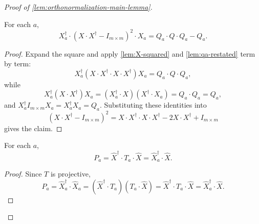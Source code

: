 \begin{proof}[Proof of \ref{lem:orthonormalization-main-lemma}]
	\begin{lemma}\label{lem:X-expression-to-Q-expression}
		\leanok
		For each $a$,
		\begin{equation*}
			X_a^\dagger \cdot (X \cdot X^\dagger - I_{m \times m})^2 \cdot X_a
			=
			Q_a \cdot Q \cdot Q_a - Q_a.
		\end{equation*}
	\end{lemma}
	\begin{proof}
		\leanok
		Expand the square and apply \ref{lem:X-squared} and \ref{lem:qa-restated} term by term:
		\[
			X_a^\dagger (X \cdot X^\dagger \cdot X \cdot X^\dagger) X_a
			=
			Q_a \cdot Q \cdot Q_a,
		\]
		while
		\[
			X_a^\dagger (X \cdot X^\dagger) X_a
			=
			(X_a^\dagger \cdot X)(X^\dagger \cdot X_a)
			=
			Q_a \cdot Q_a
			=
			Q_a,
		\]
		and $X_a^\dagger I_{m \times m} X_a = X_a^\dagger X_a = Q_a$. Substituting these identities into
		\[
			(X \cdot X^\dagger - I_{m \times m})^2
			=
			X \cdot X^\dagger \cdot X \cdot X^\dagger - 2X \cdot X^\dagger + I_{m \times m}
		\]
		gives the claim.
	\end{proof}

	\begin{lemma}[$P_a$ restated]\label{lem:pa-restated}
		\leanok
		For each $a$,
		\begin{equation*}
			P_a = \widehat{X}^\dagger \cdot T_a \cdot \widehat{X} = \widehat{X}_a^\dagger \cdot \widehat{X}.
		\end{equation*}
	\end{lemma}
	\begin{proof}
		\leanok
		Since $T$ is projective,
		\[
			P_a
			=
			\widehat{X}_a^\dagger \cdot \widehat{X}_a
			=
			(\widehat{X}^\dagger \cdot T_a)(T_a \cdot \widehat{X})
			=
			\widehat{X}^\dagger \cdot T_a \cdot \widehat{X}
			=
			\widehat{X}_a^\dagger \cdot \widehat{X}.
		\]
	\end{proof}


\end{proof}

